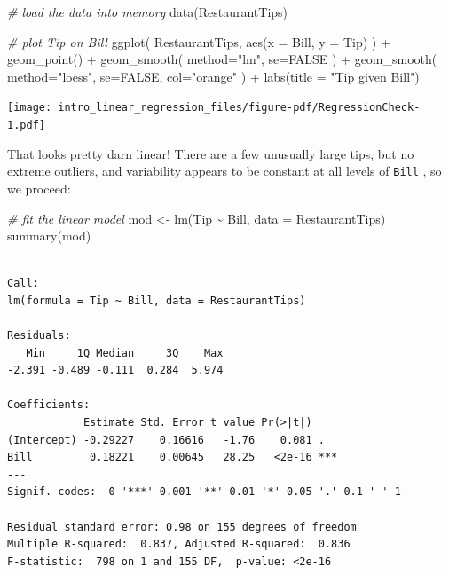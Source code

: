 \documentclass[
  letterpaper,
  DIV=11,
  numbers=noendperiod]{scrreprt}
\newenvironment{Shaded}{}{}
\newcommand{\AttributeTok}[1]{\textcolor[rgb]{0.49,0.56,0.16}{#1}}
\newcommand{\CommentTok}[1]{\textcolor[rgb]{0.38,0.63,0.69}{\textit{#1}}}
\newcommand{\ConstantTok}[1]{\textcolor[rgb]{0.53,0.00,0.00}{#1}}
\newcommand{\FunctionTok}[1]{\textcolor[rgb]{0.02,0.16,0.49}{#1}}
\newcommand{\NormalTok}[1]{#1}
\newcommand{\OtherTok}[1]{\textcolor[rgb]{0.00,0.44,0.13}{#1}}
\newcommand{\SpecialCharTok}[1]{\textcolor[rgb]{0.25,0.44,0.63}{#1}}
\newcommand{\StringTok}[1]{\textcolor[rgb]{0.25,0.44,0.63}{#1}}
\begin{document}
\begin{Shaded}
\begin{Highlighting}[]
\CommentTok{\# load the data into memory}
\FunctionTok{data}\NormalTok{(RestaurantTips)}

\CommentTok{\# plot Tip on Bill}
\FunctionTok{ggplot}\NormalTok{( RestaurantTips, }\FunctionTok{aes}\NormalTok{(}\AttributeTok{x =}\NormalTok{ Bill, }\AttributeTok{y =}\NormalTok{ Tip) ) }\SpecialCharTok{+}
    \FunctionTok{geom\_point}\NormalTok{() }\SpecialCharTok{+}
    \FunctionTok{geom\_smooth}\NormalTok{( }\AttributeTok{method=}\StringTok{"lm"}\NormalTok{, }\AttributeTok{se=}\ConstantTok{FALSE}\NormalTok{ ) }\SpecialCharTok{+}
    \FunctionTok{geom\_smooth}\NormalTok{( }\AttributeTok{method=}\StringTok{"loess"}\NormalTok{, }\AttributeTok{se=}\ConstantTok{FALSE}\NormalTok{, }\AttributeTok{col=}\StringTok{"orange"}\NormalTok{ ) }\SpecialCharTok{+}
    \FunctionTok{labs}\NormalTok{(}\AttributeTok{title =} \StringTok{"Tip given Bill"}\NormalTok{)}
\end{Highlighting}
\end{Shaded}

\begin{center}
\texttt{[image: intro\_linear\_regression\_files/figure-pdf/RegressionCheck-1.pdf]}
\end{center}

That looks pretty darn linear! There are a few unusually large tips, but
no extreme outliers, and variability appears to be constant at all
levels of \texttt{Bill} , so we proceed:

\begin{Shaded}
\begin{Highlighting}[]
\CommentTok{\# fit the linear model}
\NormalTok{mod }\OtherTok{\textless{}{-}} \FunctionTok{lm}\NormalTok{(Tip }\SpecialCharTok{\textasciitilde{}}\NormalTok{ Bill, }\AttributeTok{data =}\NormalTok{ RestaurantTips)}
\FunctionTok{summary}\NormalTok{(mod)}
\end{Highlighting}
\end{Shaded}

\begin{verbatim}

Call:
lm(formula = Tip ~ Bill, data = RestaurantTips)

Residuals:
   Min     1Q Median     3Q    Max 
-2.391 -0.489 -0.111  0.284  5.974 

Coefficients:
            Estimate Std. Error t value Pr(>|t|)    
(Intercept) -0.29227    0.16616   -1.76    0.081 .  
Bill         0.18221    0.00645   28.25   <2e-16 ***
---
Signif. codes:  0 '***' 0.001 '**' 0.01 '*' 0.05 '.' 0.1 ' ' 1

Residual standard error: 0.98 on 155 degrees of freedom
Multiple R-squared:  0.837, Adjusted R-squared:  0.836 
F-statistic:  798 on 1 and 155 DF,  p-value: <2e-16
\end{verbatim}
\end{document}
